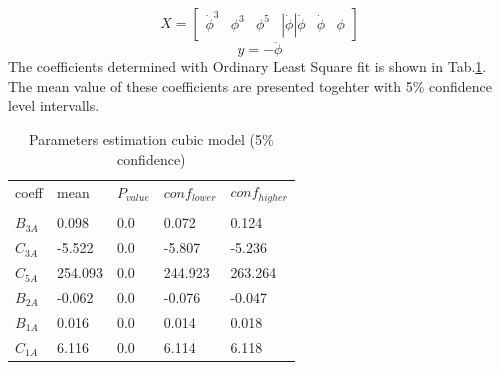 \begin{equation}
X = \left[\begin{matrix}\dot{\phi}^{3} & \phi^{3} & \phi^{5} & \left|{\dot{\phi}}\right| \dot{\phi} & \dot{\phi} & \phi\end{matrix}\right]
\label{eq:eq_X}
\end{equation}
\begin{equation}
y = - \ddot{\phi}
\label{eq:eq_y}
\end{equation}
The coefficients determined with Ordinary Least Square fit is shown in
Tab.\ref{tab:parameters_one}. The mean value of these
coefficients are presented togehter with 5\% confidence level
intervalls.
\begin{table}[H]
\scriptsize
\center
\caption{Parameters estimation cubic model (5\% confidence)}
\label{tab:parameters_one}
\begin{tabular}{|l|l|l|l|l|}
\hline\addlinespace
coeff & mean & $P_{value}$ & $conf_{lower}$ & $conf_{higher}$\\
&  &  &  & \\
\hline$B_{3A}$ & 0.098 & 0.0 & 0.072 & 0.124\\
$C_{3A}$ & -5.522 & 0.0 & -5.807 & -5.236\\
$C_{5A}$ & 254.093 & 0.0 & 244.923 & 263.264\\
$B_{2A}$ & -0.062 & 0.0 & -0.076 & -0.047\\
$B_{1A}$ & 0.016 & 0.0 & 0.014 & 0.018\\
$C_{1A}$ & 6.116 & 0.0 & 6.114 & 6.118\\
\hline
\end{tabular}
\end{table}
